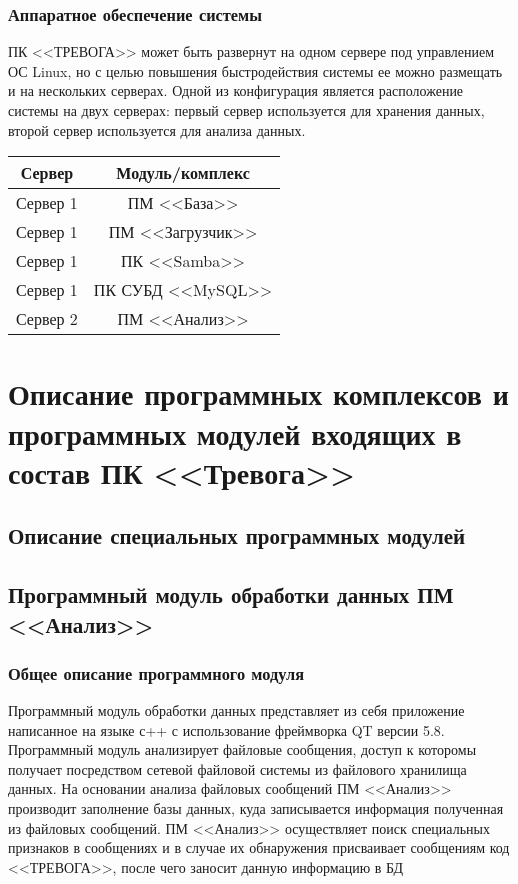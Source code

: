 ﻿\documentclass[12pt]{article}[a4paper,14pt,russian]
\begin{document}
	\subsubsection{Аппаратное обеспечение системы}
	ПК <<ТРЕВОГА>> может быть развернут на одном сервере под управлением ОС Linux, но с целью повышения быстродействия системы ее можно размещать и на нескольких серверах. Одной из конфигурация является расположение системы на двух серверах:
	первый сервер используется для хранения данных, второй сервер используется для анализа данных. 
	\begin{tabular}{|c|c|}
		\hline
		Сервер & Модуль/комплекс  \\
		\hline
		Сервер 1 & ПМ <<База>> \\
		Сервер 1 & ПМ <<Загрузчик>> \\
		Сервер 1 & ПК <<Samba>> \\
		Сервер 1 & ПК СУБД <<MySQL>> \\
		Сервер 2 & ПМ <<Анализ>> \\
		
	\end{tabular}
	\section{Описание программных комплексов и программных модулей входящих в состав ПК <<Тревога>>}
	\subsection{Описание специальных программных модулей}
	\subsection{Программный модуль обработки данных ПМ <<Анализ>>}
	\subsubsection{Общее описание программного модуля}
	Программный модуль обработки данных представляет из себя приложение написанное на
	языке с++ с использование фреймворка QT версии 5.8. Программный модуль анализирует файловые сообщения, доступ к которомы получает посредством сетевой файловой системы из файлового хранилища данных. На основании анализа файловых сообщений ПМ <<Анализ>> производит заполнение базы данных, куда записывается информация полученная из файловых сообщений. ПМ <<Анализ>> осуществляет поиск специальных признаков в сообщениях и в случае их обнаружения присваивает сообщениям код <<ТРЕВОГА>>, после чего заносит данную информацию в БД
	
\end{document}
